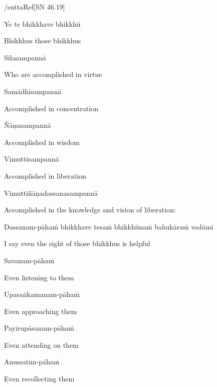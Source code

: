 /suttaRef{[SN 46.19]}

Ye te bhikkhave bhikkhū

\begin{english}
  Bhikkhus those bhikkhus
\end{english}

Sīlasampannā

\begin{english}
  Who are accomplished in virtue
\end{english}

Samādhisampannā

\begin{english}
  Accomplished in concentration
\end{english}

Ñāṇasampannā

\begin{english}
  Accomplished in wisdom
\end{english}

Vimuttisampannā

\begin{english}
  Accomplished in liberation
\end{english}

Vimuttiñāṇadassanasampannā

\begin{english}
  Accomplished in the knowledge and vision of liberation:
\end{english}

Dassanam-pāhaṁ bhikkhave tesaṁ bhikkhūnaṁ bahukāraṁ vadāmi

\begin{english}
  I say even the sight of those bhikkhus is helpful
\end{english}

Savanam-pāhaṁ

\begin{english}
  Even listening to them
\end{english}

Upasaṅkamanam-pāhaṁ

\begin{english}
  Even approaching them
\end{english}

Payirupāsanam-pāhaṁ

\begin{english}
  Even attending on them
\end{english}

Anussatim-pāhaṁ

\begin{english}
  Even recollecting them
\end{english}

